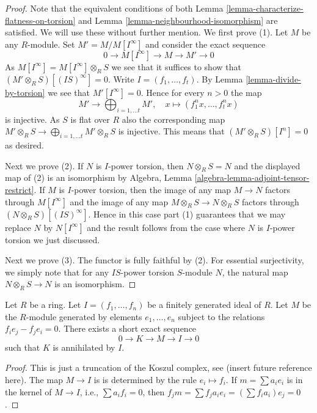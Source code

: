 \begin{proof}
Note that the equivalent conditions of both
Lemma \ref{lemma-characterize-flatness-on-torsion} and
Lemma \ref{lemma-neighbourhood-isomorphism}
are satisfied. We will use these without further mention.
We first prove (1). Let $M$ be any $R$-module.
Set $M' = M/M[I^\infty]$ and consider the exact sequence
$$
0 \to M[I^\infty] \to M \to M' \to 0
$$
As $M[I^\infty] = M[I^\infty] \otimes_R S$ we see that it suffices to
show that $(M' \otimes_R S)[(IS)^\infty] = 0$.
Write $I = (f_1, \ldots, f_t)$. By
Lemma \ref{lemma-divide-by-torsion}
we see that $M'[I^\infty] = 0$. Hence for every $n > 0$ the map
$$
M' \longrightarrow \bigoplus\nolimits_{i = 1, \ldots t} M',
\quad
x \longmapsto (f_1^n x, \ldots, f_t^n x)
$$
is injective. As $S$ is flat over $R$ also the corresponding map
$M' \otimes_R S \to \bigoplus_{i = 1, \ldots t} M' \otimes_R S$
is injective. This means that $(M' \otimes_R S)[I^n] = 0$ as desired.

\medskip\noindent
Next we prove (2). If $N$ is $I$-power torsion, then
$N \otimes_R S = N$ and the displayed map of (2) is an isomorphism by
Algebra, Lemma \ref{algebra-lemma-adjoint-tensor-restrict}.
If $M$ is $I$-power torsion, then the image of any map
$M \to N$ factors through $M[I^\infty]$ and the image of any map
$M \otimes_R S \to N \otimes_R S$ factors through
$(N \otimes_R S)[(IS)^\infty]$. Hence in this case
part (1) guarantees that we may replace $N$ by $N[I^\infty]$
and the result follows from the case where $N$ is $I$-power torsion
we just discussed.

\medskip\noindent
Next we prove (3). The functor is fully faithful by (2).
For essential surjectivity, we simply note that for any $IS$-power torsion
$S$-module $N$, the natural map $N \otimes_R S \to N$ is an isomorphism.
\end{proof}

\begin{lemma}
\label{lemma-naive-Koszul-complex}
Let $R$ be a ring. Let $I = (f_1, \ldots, f_n)$ be a finitely generated ideal
of $R$. Let $M$ be the $R$-module generated by elements
$e_1, \ldots, e_n$ subject to the relations $f_i e_j - f_j e_i = 0$.
There exists a short exact sequence
$$
0 \to K \to M \to I \to 0
$$
such that $K$ is annihilated by $I$.
\end{lemma}

\begin{proof}
This is just a truncation of the Koszul complex, see (insert future
reference here).
The map $M \to I$ is is determined by the rule $e_i \mapsto f_i$. If
$m = \sum a_i e_i$ is in the kernel of $M \to I$, i.e., $\sum a_i f_i = 0$,
then $f_j m = \sum f_j a_i e_i = (\sum f_i a_i) e_j = 0$.
\end{proof}

